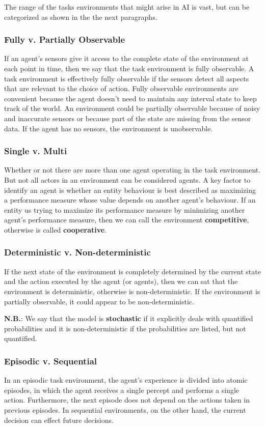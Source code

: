 \documentclass{article}
\begin{document}
The range of the tasks environments that might arise in AI is vast, but can be categorized as shown in the the next paragraphs.

\subsubsection{Fully v. Partially Observable}
If an agent's sensors give it access to the complete state of the environment at each point in time, then we say that the task environment is fully observable.
A task environment is effectively fully observable if the sensors detect all aspects that are relevant to the choice of action. 
Fully observable environments are convenient because the agent doesn't need to maintain any interval state to keep track of the world.
An environment could be partially observable because of noisy and inaccurate sensors or because part of the state are missing from the sensor data. If the agent has no sensors, the environment is unobservable.

\subsubsection{Single v. Multi}
Whether or not there are more than one agent operating in the task environment. But not all actors in an environment can be considered agents. A key factor to identify an agent is whether an entity behaviour is best described as maximizing a performance measure whose value depends on another agent's behaviour. 
If an entity us trying to maximize its performance measure by minimizing another agent's performance measure, then we can call the environment \textbf{competitive}, otherwise is called \textbf{cooperative}.

\subsubsection{Deterministic v. Non-deterministic}
If the next state of the environment is completely determined by the current state and the action executed by the agent (or agents), then we can sat that the environment is deterministic, otherwise is non-deterministic.
If the environment is partially observable, it could appear to be non-deterministic.

\textbf{N.B.}: We say that the model is \textbf{stochastic} if it explicitly deals with quantified probabilities and it is non-deterministic if the probabilities are listed, but not quantified.

\subsubsection{Episodic v. Sequential}
In an episodic task environment, the agent's experience is divided into atomic episodes, in which the agent receives a single percept and performs a single action. Furthermore, the next episode does not depend on the actions taken in previous episodes. In sequential environments, on the other hand, the current decision can effect future decisions.
\end{document}
